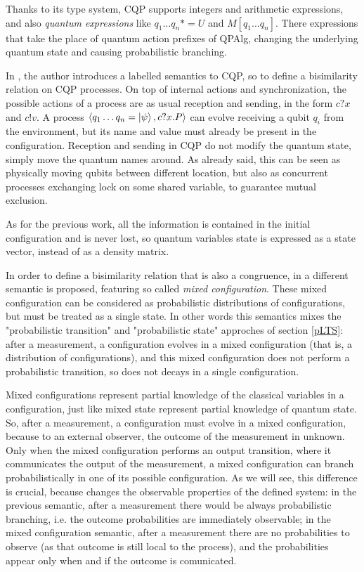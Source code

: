 Thanks to its type system, CQP supports integers and arithmetic expressions, and also \textit{quantum expressions} like $q_1\ldots q_n *= U$ and $M[q_1 \ldots q_n]$. There expressions that take the place of quantum action prefixes of QPAlg, changing the underlying quantum state and causing probabilistic branching.
 

In \cite{davidsonFormalVerificationTechniques2012}, the author introduces a labelled semantics  to CQP, so to define a bisimilarity relation on CQP processes. On top of internal actions and synchronization, the possible actions of a process are as usual reception and sending, in the form $c?x$ and $c!v$. A process $\langle q_1 \ldots q_n = \ket{\psi}, c?x.P\rangle$ can evolve receiving a qubit $q_i$ from the environment, but its name and value must already be present in the configuration. Reception and sending in CQP do not modify the quantum state, simply move the quantum names around. As already said, this can be seen as physically moving qubits between different location, but also as concurrent processes exchanging lock on some shared variable, to guarantee mutual exclusion.


As for the previous work, all the information is contained in the initial configuration and is never lost, so quantum variables state is expressed as a state vector, instead of as a density matrix.



In order to define a bisimilarity relation that is also a congruence, in \cite{davidsonFormalVerificationTechniques2012} a different semantic is proposed, featuring so called \textit{mixed configuration}. These mixed configuration can be considered as probabilistic distributions of configurations, but must be treated as a single state. In other words this semantics mixes the "probabilistic transition" and "probabilistic state" approches of section \ref{pLTS}: after a measurement, a configuration evolves in a mixed configuration (that is, a distribution of configurations), and this mixed configuration does not perform a probabilistic transition, so does not decays in a single configuration. 

Mixed configurations represent partial knowledge of the classical variables in a configuration, just like mixed state represent partial knowledge of quantum state. So, after a measurement, a configuration must evolve in a mixed configuration, because to an external observer, the outcome of the measurement in unknown. Only when the mixed configuration performs an output transition, where it communicates the output of the measurement, a mixed configuration can branch probabilistically in one of its possible configuration. As we will see, this difference is crucial, because changes the observable properties of the defined system: in the previous semantic, after a measurement there would be always probabilistic branching, i.e. the outcome probabilities are immediately observable; in the mixed configuration semantic, after a measurement there are no probabilities to observe (as that outcome is still local to the process), and the probabilities appear only when and if the outcome is comunicated.

